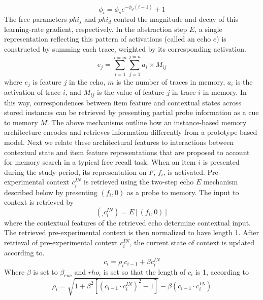 {}$$\phi_i = \phi_se^{-\phi_d(i-1)} + 1$$\markdownRendererInterblockSeparator
{}The free parameters $phi_s$ and $phi_d$ control the magnitude and decay of this learning-rate gradient, respectively.\markdownRendererInterblockSeparator
{}In the abstraction step $E$, a single representation reflecting this pattern of activations (called an echo $e$) is constructed by summing each trace, weighted by its corresponding activation.\markdownRendererInterblockSeparator
{}$$e_j = \sum^{i=m}_{i=1}\sum^{j=n}_{j=1}a_i \times M_{ij}$$\markdownRendererInterblockSeparator
{}where $e_j$ is feature $j$ in the echo, $m$ is the number of traces in memory, $a_i$ is the activation of trace $i$, and $M_{ij}$ is the value of feature $j$ in trace $i$ in memory.\markdownRendererInterblockSeparator
{}In this way, correspondences between item feature and contextual states across stored instances can be retrieved by presenting partial probe information as a cue to memory $M$.\markdownRendererInterblockSeparator
{}\markdownRendererInterblockSeparator
{}The above mechanisms outline how an instance-based memory architecture encodes and retrieves information differently from a prototype-based model. Next we relate these architectural features to interactions between contextual state and item feature representations that are proposed to account for memory search in a typical free recall task.\markdownRendererInterblockSeparator
{}When an item $i$ is presented during the study period, its representation on $F$, $f_i$, is activated. Pre-experimental context $c_{i}^{IN}$ is retrieved using the two-step echo $E$ mechanism described below by presenting $(f_i, 0)$ as a probe to memory. The input to context is retrieved by\markdownRendererInterblockSeparator
{}$$(_ , c_{i}^{IN}) = E\left[(f_i, 0)\right]$$\markdownRendererInterblockSeparator
{}where the contextual features of the retrieved echo determine contextual input. The retrieved pre-experimental context is then normalized to have length 1.\markdownRendererInterblockSeparator
{}After retrieval of pre-experimental context $c_{i}^{IN}$, the current state of context is updated according to.\markdownRendererInterblockSeparator
{}$$c_i = \rho_ic_{i-1} + \beta c_{i}^{IN}$$\markdownRendererInterblockSeparator
{}Where $\beta$ is set to $\beta_{enc}$ and $rho_i$ is set so that the length of $c_i$ is 1, according to\markdownRendererInterblockSeparator
{}$$\rho_i = \sqrt{1 + \beta^2\left[\left(c_{i-1} \cdot c^{IN}_i\right)^2 - 1\right]} - \beta\left(c_{i-1} \cdot c^{IN}_i\right)$$\markdownRendererInterblockSeparator
